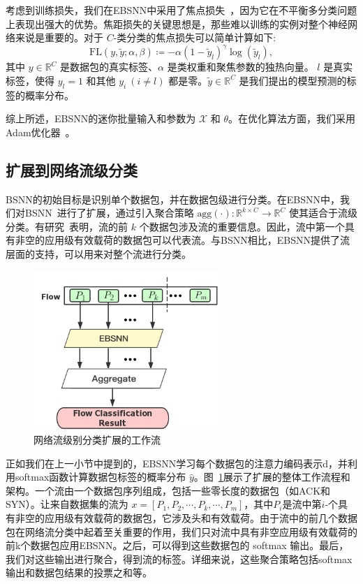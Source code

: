 \documentclass[degree=master,cjk-font=noto]{thuthesis}
\begin{document}
考虑到训练损失，我们在EBSNN中采用了焦点损失~\cite{8417976}，因为它在不平衡多分类问题上表现出强大的优势。焦距损失的关键思想是，那些难以训练的实例对整个神经网络来说是重要的。对于 $C$-类分类的焦点损失可以简单计算如下:
\begin{equation}
	\text{FL}(y, \tilde{y}; \alpha, \beta) \coloneqq -\alpha(1 - \tilde{y}_l)^\gamma \log(\tilde{y}_l),
\end{equation}
其中 $y \in \mathbb{R}^C$ 是数据包的真实标签、$\alpha$ 是类权重和聚焦参数的独热向量。 $l$ 是真实标签，使得 $y_l = 1$ 和其他 $y_i \ (i \ne l)$ 都是零。$\tilde{y} \in \mathbb{R}^C$ 是我们提出的模型预测的标签的概率分布。

综上所述，EBSNN的迷你批量输入和参数为 $\mathcal{X}$ 和 $\theta$。在优化算法方面，我们采用Adam优化器~\cite{Adam}。

\subsection{扩展到网络流级分类}
\label{flow}

BSNN的初始目标是识别单个数据包，并在数据包级进行分类。在EBSNN中，我们对BSNN~\cite{bsnn}进行了扩展，通过引入聚合策略 $\text{agg}(\cdot): \mathbb{R}^{k \times C} \rightarrow \mathbb{R}^{C}$ 使其适合于流级分类。有研究~\cite{b12, MAAF}表明，流的前 $k$ 个数据包涉及流的重要信息。因此，流中第一个具有非空的应用级有效载荷的数据包可以代表流。与BSNN相比，EBSNN提供了流层面的支持，可以用来对整个流进行分类。

\begin{figure}[!tp]
	\centerline{\includegraphics[width=7cm]{BSNN_Extension_Flow.png}}
	\caption{网络流级别分类扩展的工作流}
	\label{fig_extension_flow}
\end{figure}

正如我们在上一小节中提到的，EBSNN学习每个数据包的注意力编码表示d，并利用softmax函数计算数据包标签的概率分布 $\hat{y}$。图~\ref{fig_extension_flow}展示了扩展的整体工作流程和架构。一个流由一个数据包序列组成，包括一些零长度的数据包（如ACK和SYN）。让来自数据集的流为 $x = [P_1, P_2, \cdots, P_k, \cdots, P_m]$，其中$P_i$是流中第$i$-个具有非空的应用级有效载荷的数据包，它涉及头和有效载荷。由于流中的前几个数据包在网络流分类中起着至关重要的作用，我们只对流中具有非空应用级有效载荷的前k个数据包应用EBSNN。之后，可以得到这些数据包的 softmax 输出。最后，我们对这些输出进行聚合，得到流的标签。详细来说，这些聚合策略包括softmax输出和数据包结果的投票之和等。
\end{document}
